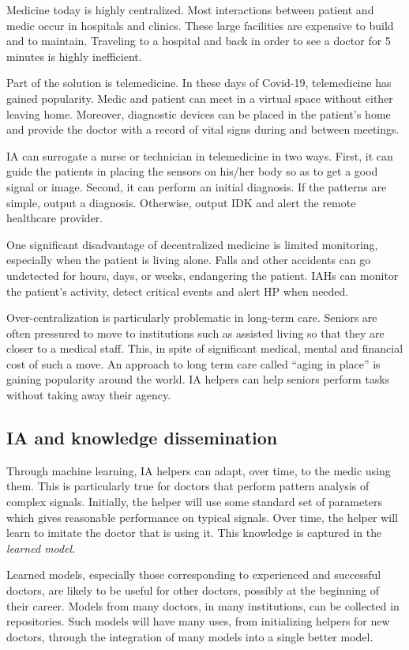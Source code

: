 \documentclass[11pt]{pnas-new}
\begin{document}
Medicine today is highly centralized. Most interactions
between patient and medic occur in hospitals and clinics. These
large facilities are expensive to build and to maintain. Traveling to
a hospital and back in order to see a doctor for 5 minutes is highly
inefficient. 

Part of the solution is telemedicine. In these days of Covid-19,
telemedicine has gained popularity. Medic and patient can meet in a
virtual space without either leaving home. Moreover, diagnostic
devices can be placed in the patient's home and provide the doctor with
{a record of vital signs during and between meetings.}


IA can surrogate a nurse or technician in telemedicine in two ways. First,
it can guide the patients in placing the sensors on his/her
body so as to get a good signal or image. Second, it can perform an
initial diagnosis. If the patterns are simple, output a diagnosis.
Otherwise, output IDK and alert the remote healthcare provider. 

One significant disadvantage of decentralized medicine is {limited} monitoring, especially when the patient is living alone. 
Falls and other accidents can go undetected for hours, days, or weeks, endangering the patient. IAHs can monitor the patient's activity, detect critical events and alert HP when needed.

Over-centralization is particularly problematic in long-term care.
Seniors are often pressured to move to institutions such as
assisted living so that they are closer to a medical staff. This, in
spite of significant medical, mental and financial cost of such a
move. An approach to long term care called ``aging in
place'' is gaining popularity around the world. IA helpers can help
seniors perform tasks without taking away their agency.


\subsection{IA and knowledge dissemination}

Through machine learning, IA helpers can adapt, over time, to the
medic using them. This is particularly true for  doctors that
perform pattern analysis of complex signals. Initially, the helper will
use some standard set of parameters which gives reasonable performance on
typical signals. Over time, the helper will learn to imitate the
doctor that is using it. This knowledge is captured in the  {\em learned model}.

Learned models, especially those corresponding to experienced and
successful doctors, are likely to be useful for other doctors,
possibly at the beginning of their career. Models from many doctors,
in many institutions, can be collected in repositories. Such models
will have many uses, from initializing helpers for new doctors,
through the integration of many models into a single better model.
\end{document}
